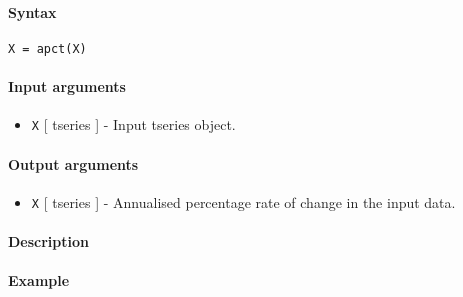 


	\paragraph{Syntax}\label{syntax}

\begin{verbatim}
X = apct(X)
\end{verbatim}

\paragraph{Input arguments}\label{input-arguments}

\begin{itemize}
\itemsep1pt\parskip0pt
\item
  \texttt{X} {[} tseries {]} - Input tseries object.
\end{itemize}

\paragraph{Output arguments}\label{output-arguments}

\begin{itemize}
\itemsep1pt\parskip0pt
\item
  \texttt{X} {[} tseries {]} - Annualised percentage rate of change in
  the input data.
\end{itemize}

\paragraph{Description}\label{description}

\paragraph{Example}\label{example}


